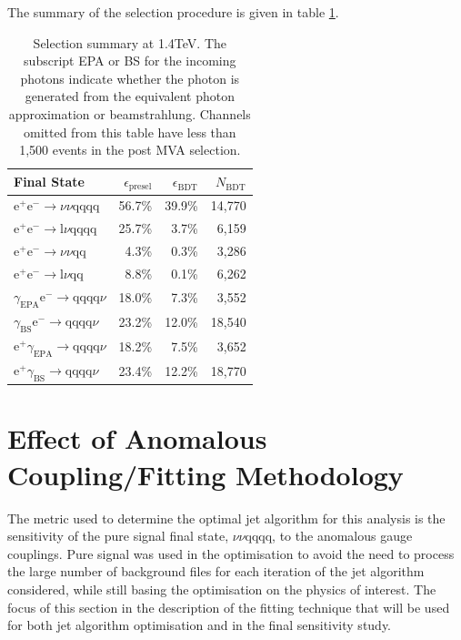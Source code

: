 The summary of the selection procedure is given in table \ref{table:selectionsummary1400GeV}.

\begin{table}[h!]
\centering
\begin{tabular}{ l r r r }
\hline
Final State & $\epsilon_{\text{presel}}$ & $\epsilon_{\text{BDT}}$ & $N_{\text{BDT}}$ \\ 
\hline
$\text{e}^{+}\text{e}^{-} \rightarrow \nu{\nu}\text{qqqq}$ & 56.7\% & 39.9\% & 14,770 \\
$\text{e}^{+}\text{e}^{-} \rightarrow \text{l}\nu\text{qqqq}$ & 25.7\% & 3.7\% & 6,159 \\
$\text{e}^{+}\text{e}^{-} \rightarrow \nu{\nu}\text{qq}$ & 4.3\% & 0.3\% & 3,286 \\
$\text{e}^{+}\text{e}^{-} \rightarrow \text{l}\nu\text{qq}$ & 8.8\% & 0.1\% & 6,262 \\
$\gamma_{\text{EPA}}\text{e}^{-} \rightarrow \text{qqqq}\nu$ & 18.0\% & 7.3\% & 3,552 \\
$\gamma_{\text{BS}}\text{e}^{-} \rightarrow \text{qqqq}\nu$ & 23.2\% & 12.0\% & 18,540 \\
$\text{e}^{+}\gamma_{\text{EPA}} \rightarrow \text{qqqq}\nu$ & 18.2\% & 7.5\% & 3,652 \\
$\text{e}^{+}\gamma_{\text{BS}} \rightarrow \text{qqqq}\nu$ & 23.4\% & 12.2\% & 18,770 \\
\hline
\end{tabular}
\caption[Selection summary at 1.4TeV.]{Selection summary at 1.4TeV.   The subscript EPA or BS for the incoming photons indicate whether the photon is generated from the equivalent photon approximation or beamstrahlung.  Channels omitted from this table have less than 1,500 events in the post MVA selection.}
\label{table:selectionsummary1400GeV}
\end{table}








\section{Effect of Anomalous Coupling/Fitting Methodology}
The metric used to determine the optimal jet algorithm for this analysis is the sensitivity of the pure signal final state, $\nu\nu\text{qqqq}$, to the anomalous gauge couplings.  Pure signal was used in the optimisation to avoid the need to process the large number of background files for each iteration of the jet algorithm considered, while still basing the optimisation on the physics of interest.  The focus of this section in the description of the fitting technique that will be used for both jet algorithm optimisation and in the final sensitivity study.

